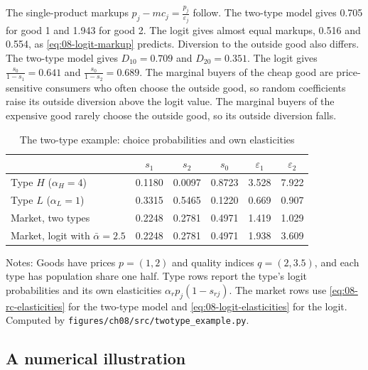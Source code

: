 \begin{example}
The single-product markups $p_j - mc_j = \frac{p_j}{\varepsilon_j}$ follow. The two-type model gives 0.705
for good 1 and 1.943 for good 2. The logit gives almost equal markups, 0.516 and 0.554, as
\eqref{eq:08-logit-markup} predicts. Diversion to the outside good also differs. The two-type model gives
$D_{10} = 0.709$ and $D_{20} = 0.351$. The logit gives $\frac{s_0}{1 - s_1} = 0.641$ and $\frac{s_0}{1 - s_2} =
0.689$. The marginal buyers of the cheap good are price-sensitive consumers who often choose the outside good,
so random coefficients raise its outside diversion above the logit value. The marginal buyers of the expensive good
rarely choose the outside good, so its outside diversion falls.
\end{example}

\begin{table}[htbp]
\centering
\caption{The two-type example: choice probabilities and own elasticities}\label{tab:08-twotype}
\begin{tabular}{lccccc}
\toprule
 & $s_1$ & $s_2$ & $s_0$ & $\varepsilon_1$ & $\varepsilon_2$ \\
\midrule
Type $H$ ($\alpha_H = 4$) & 0.1180 & 0.0097 & 0.8723 & 3.528 & 7.922 \\
Type $L$ ($\alpha_L = 1$) & 0.3315 & 0.5465 & 0.1220 & 0.669 & 0.907 \\
\addlinespace
Market, two types & 0.2248 & 0.2781 & 0.4971 & 1.419 & 1.029 \\
Market, logit with $\bar\alpha = 2.5$ & 0.2248 & 0.2781 & 0.4971 & 1.938 & 3.609 \\
\bottomrule
\end{tabular}

\smallskip
\begin{minipage}{0.92\linewidth}
\footnotesize Notes: Goods have prices $p = (1, 2)$ and quality indices $q = (2, 3.5)$, and each type has
population share one half. Type rows report the type's logit probabilities and its own elasticities
$\alpha_r p_j(1 - s_{rj})$. The market rows use \eqref{eq:08-rc-elasticities} for the two-type model and
\eqref{eq:08-logit-elasticities} for the logit. Computed by \texttt{figures/ch08/src/twotype\_example.py}.
\end{minipage}
\end{table}

\subsection{A numerical illustration}\label{sec:08-illustration}

